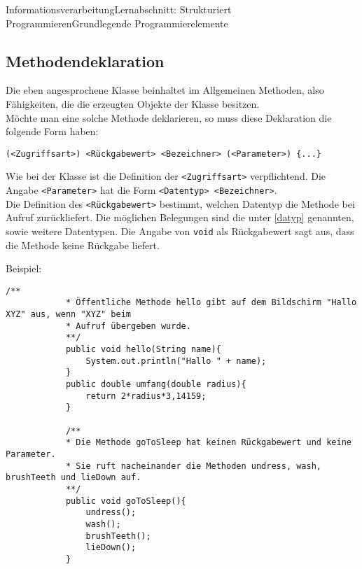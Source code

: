 \documentclass[11pt,oneside,openany,headings=optiontotoc,11pt,numbers=noenddot]{article}
\begin{document}
\begin{worksheet}{Informationsverarbeitung}{Lernabschnitt: Strukturiert Programmieren}{Grundlegende Programmierelemente}
		\subsection{Methodendeklaration}
		Die eben angesprochene Klasse beinhaltet im Allgemeinen Methoden, also \glqq{}Fähigkeiten\grqq{}, die die erzeugten Objekte der Klasse besitzen.\\
		Möchte man eine solche Methode deklarieren, so muss diese Deklaration die folgende Form haben:
		\begin{lstlisting}[style=Python]
			(<Zugriffsart>) <Rückgabewert> <Bezeichner> (<Parameter>) {...}
		\end{lstlisting}
		Wie bei der Klasse ist die Definition der \lstinline[style=Python]{<Zugriffsart>} verpflichtend. Die Angabe \lstinline[style=Python]{<Parameter>} hat die Form \lstinline[style=Python]{<Datentyp> <Bezeichner>}.\\
		Die Definition des \lstinline[style=Python]{<Rückgabewert>} bestimmt, welchen Datentyp die Methode bei Aufruf zurückliefert. Die möglichen Belegungen sind die unter \ref{datyp} genannten, sowie weitere Datentypen. Die Angabe von \lstinline[style=Python]{void} als Rückgabewert sagt aus, dass die Methode keine Rückgabe liefert.\\
		\par\noindent
		Beispiel:
		\begin{lstlisting}[style=Python,frame=single]
			/**
			* Öffentliche Methode hello gibt auf dem Bildschirm "Hallo XYZ" aus, wenn "XYZ" beim
			* Aufruf übergeben wurde.
			**/
			public void hello(String name){
				System.out.println("Hallo " + name);
			}			
			public double umfang(double radius){
				return 2*radius*3,14159;
			}
			
			/**
			* Die Methode goToSleep hat keinen Rückgabewert und keine Parameter.
			* Sie ruft nacheinander die Methoden undress, wash, brushTeeth und lieDown auf.
			**/
			public void goToSleep(){
				undress();
				wash();
				brushTeeth();
				lieDown();
			}
		\end{lstlisting}

\end{worksheet}
\end{document}
